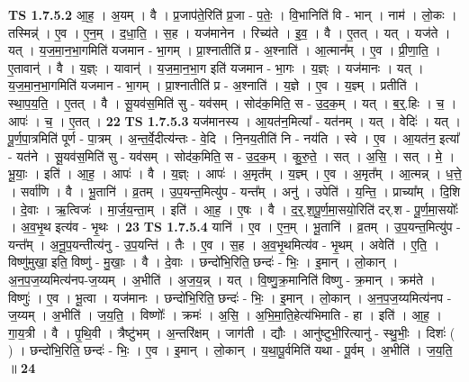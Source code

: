 \documentclass[17pt]{extarticle}
\begin{document}
                  \newline
                                \textbf{ TS 1.7.5.2} \newline
                  आ॒ह॒ । अ॒यम् । वै । प्र॒जाप॑ते॒रिति॑ प्र॒जा - प॒तेः॒ । वि॒भानिति॑ वि - भान् । नाम॑ । लो॒कः । तस्मिन्न्॑ । ए॒व । ए॒न॒म् । द॒धा॒ति॒ । स॒ह । यज॑मानेन । रिच्य॑ते । इ॒व॒ । वै । ए॒तत् । यत् । यज॑ते । यत् । य॒ज॒मा॒न॒भा॒गमिति॑ यजमान - भा॒गम् । प्रा॒श्नातीति॑ प्र - अ॒श्नाति॑ । आ॒त्मान᳚म् । ए॒व । प्री॒णा॒ति॒ । ए॒तावान्॑ । वै । य॒ज्ञ्ः । यावान्॑ । य॒ज॒मा॒न॒भा॒ग इति॑ यजमान - भा॒गः । य॒ज्ञ्ः । यज॑मानः । यत् । य॒ज॒मा॒न॒भा॒गमिति॑ यजमान - भा॒गम् । प्रा॒श्नातीति॑ प्र - अ॒श्नाति॑ । य॒ज्ञे । ए॒व । य॒ज्ञ्म् । प्रतीति॑ । स्था॒प॒य॒ति॒ । ए॒तत् । वै । सू॒यव॑स॒मिति॑ सु - यव॑सम् । सोद॑क॒मिति॒ स - उ॒द॒क॒म् । यत् । ब॒र्॒.हिः । च॒ । आपः॑ । च॒ । ए॒तत् । \textbf{  22} \newline
                  \newline
                                \textbf{ TS 1.7.5.3} \newline
                  यज॑मानस्य । आ॒यत॑न॒मित्या᳚ - यत॑नम् । यत् । वेदिः॑ । यत् । पू॒र्ण॒पा॒त्रमिति॑ पूर्ण - पा॒त्रम् । अ॒न्त॒र्वे॒दीत्य॑न्तः - वे॒दि । नि॒नय॒तीति॑ नि - नय॑ति । स्वे । ए॒व । आ॒यत॑न॒ इत्या᳚ - यत॑ने । सू॒यव॑स॒मिति॑ सु - यव॑सम् । सोद॑क॒मिति॒ स - उ॒द॒क॒म् । कु॒रु॒ते॒ । सत् । अ॒सि॒ । सत् । मे॒ । भू॒याः॒ । इति॑ । आ॒ह॒ । आपः॑ । वै । य॒ज्ञ्ः । आपः॑ । अ॒मृत᳚म् । य॒ज्ञ्म् । ए॒व । अ॒मृत᳚म् । आ॒त्मन्न् । ध॒त्ते॒ । सर्वा॑णि । वै । भू॒तानि॑ । व्र॒तम् । उ॒प॒यन्त॒मित्यु॑प - यन्त᳚म् । अनु॑ । उपेति॑ । य॒न्ति॒ । प्राच्या᳚म् । दि॒शि । दे॒वाः । ऋ॒त्विजः॑ । मा॒र्ज॒य॒न्ता॒म् । इति॑ । आ॒ह॒ । ए॒षः । वै । द॒र्॒.श॒पू॒र्ण॒मा॒सयो॒रिति॑ दर्.श - पू॒र्ण॒मा॒सयोः᳚ । अ॒व॒भृ॒थ इत्य॑व - भृ॒थः । \textbf{  23} \newline
                  \newline
                                \textbf{ TS 1.7.5.4} \newline
                  यानि॑ । ए॒व । ए॒न॒म् । भू॒तानि॑ । व्र॒तम् । उ॒प॒यन्त॒मित्यु॑प - यन्त᳚म् । अ॒नू॒प॒यन्तीत्य॑नु - उ॒प॒यन्ति॑ । तैः । ए॒व । स॒ह । अ॒व॒भृ॒थमित्य॑व - भृ॒थम् । अवेति॑ । ए॒ति॒ । विष्णु॑मुखा॒ इति॒ विष्णु॑ - मु॒खाः॒ । वै । दे॒वाः । छन्दो॑भि॒रिति॒ छन्दः॑ - भिः॒ । इ॒मान् । लो॒कान् । अ॒न॒प॒ज॒य्यमित्य॑नप-ज॒य्यम् । अ॒भीति॑ । अ॒ज॒य॒न्न् । यत् । वि॒ष्णु॒क्र॒मानिति॑ विष्णु - क्र॒मान् । क्रम॑ते । विष्णुः॑ । ए॒व । भू॒त्वा । यज॑मानः । छन्दो॑भि॒रिति॒ छन्दः॑ - भिः॒ । इ॒मान् । लो॒कान् । अ॒न॒प॒ज॒य्यमित्य॑नप - ज॒य्यम् । अ॒भीति॑ । ज॒य॒ति॒ । विष्णोः᳚ । क्रमः॑ । अ॒सि॒ । अ॒भि॒मा॒ति॒हेत्य॑भिमाति - हा । इति॑ । आ॒ह॒ । गा॒य॒त्री । वै । पृ॒थि॒वी । त्रैष्टु॑भम् । अ॒न्तरि॑क्षम् । जाग॑ती । द्यौः । आनु॑ष्टुभी॒रित्यानु॑ - स्थु॒भीः॒ । दिशः॑ ( ) । छन्दो॑भि॒रिति॒ छन्दः॑ - भिः॒ । ए॒व । इ॒मान् । लो॒कान् । य॒था॒पू॒र्वमिति॑ यथा - पू॒र्वम् । अ॒भीति॑ । ज॒य॒ति॒ ॥ \textbf{  24} \newline
\end{document}
